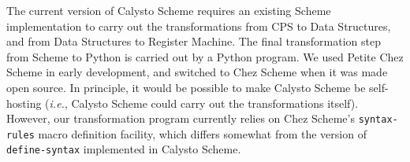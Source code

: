 \documentclass[acmsmall,screen,authorversion]{acmart}
\begin{document}
The current version of Calysto Scheme requires an existing Scheme
implementation to carry out the transformations from CPS to Data Structures,
and from Data Structures to Register Machine.  The final transformation step
from Scheme to Python is carried out by a Python program.  We used Petite Chez
Scheme in early development, and switched to Chez Scheme when it was made open
source. In principle, it would be possible to make Calysto Scheme be
self-hosting (\emph{i.e.}, Calysto Scheme could carry out the transformations
itself). However, our transformation program currently relies on Chez Scheme's
\texttt{syntax-rules} macro definition facility, which differs somewhat from
the version of \texttt{define-syntax} implemented in Calysto Scheme.

\end{document}
